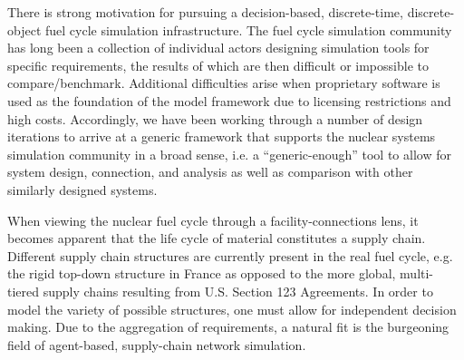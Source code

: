 
There is strong motivation for pursuing a decision-based, 
discrete-time, discrete-object fuel cycle simulation infrastructure. 
The fuel cycle simulation community has long been a collection of 
individual actors designing simulation tools for specific 
requirements, the results of which are then difficult or impossible 
to compare/benchmark. Additional difficulties arise when proprietary 
software is used as the foundation of the model framework due to 
licensing restrictions and high costs. Accordingly, we have been 
working through a number of design iterations to arrive at a generic 
framework that supports the nuclear systems simulation community in a 
broad sense, i.e. a ``generic-enough'' tool to allow for system design, 
connection, and analysis as well as comparison with other similarly 
designed systems.

When viewing the nuclear fuel cycle through a facility-connections 
lens, it becomes apparent that the life cycle of material constitutes 
a supply chain. Different supply chain structures are currently 
present in the real fuel cycle, e.g. the rigid top-down structure in France 
as opposed to the more global, multi-tiered supply chains resulting 
from U.S. Section 123 Agreements. In order to model the variety of
possible structures, one must allow for independent decision making. 
Due to the aggregation of requirements, a natural fit is the 
burgeoning field of agent-based, supply-chain network simulation.
